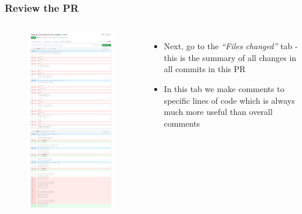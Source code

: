 \documentclass[aspectratio=169]{beamer} %
\begin{document}
\begin{frame}
	\frametitle{Review the PR}
	\begin{columns}[c]

		\vspace{-.2cm}
		\begin{figure}
			\centering
			\includegraphics[width=.6\textwidth]{./img/review-1.png}
		\end{figure}

		\begin{itemize}
			\setlength\itemsep{1.5em}
			\item Next, go to the \textit{``Files changed''} tab
			- this is the summary of all changes in all commits in this PR
			\item In this tab we make comments to specific lines of code which is always much more useful than overall comments
		\end{itemize}

	\end{columns}
\end{frame}
\end{document}
